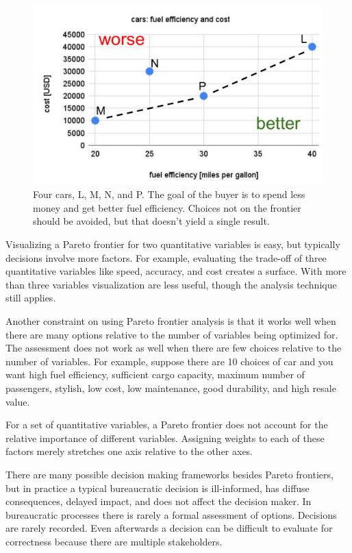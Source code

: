 \begin{figure}[ht]
    \centering
    \includegraphics[width=1\textwidth]{images/pareto_frontier_car_options.pdf}
    \caption{Four cars, L, M, N, and P. The goal of the buyer is to spend less money and get better fuel efficiency. Choices not on the frontier should be avoided, but that doesn't yield a single result.}
    \label{fig:pareto_frontier_cars}
\end{figure}

Visualizing a Pareto frontier for two quantitative variables is easy, but typically decisions involve more factors. For example, evaluating the trade-off of three quantitative variables like speed, accuracy, and cost creates a surface. With more than three variables visualization are less useful, though the analysis technique still applies. 

Another constraint on using Pareto frontier analysis is that it works well when there are many options relative to the number of variables being optimized for. 
The assessment does not work as well when there are few choices relative to the number of variables. For example, suppose there are 10 choices of car and you want high fuel efficiency, sufficient cargo capacity, maximum number of passengers, stylish, low cost, low maintenance, good durability, and high resale value. 

For a set of quantitative variables, a Pareto frontier does not account for the relative importance of different variables. Assigning weights to each of these factors merely stretches one axis relative to the other axes. 

There are many possible decision making frameworks besides Pareto frontiers, but in practice a typical bureaucratic decision is ill-informed, has diffuse consequences, delayed impact, and does not affect the decision maker. In bureaucratic processes there is rarely a formal assessment of options. 
Decisions are rarely recorded. 
Even afterwards a decision can be difficult to evaluate for correctness because there are multiple stakeholders.

